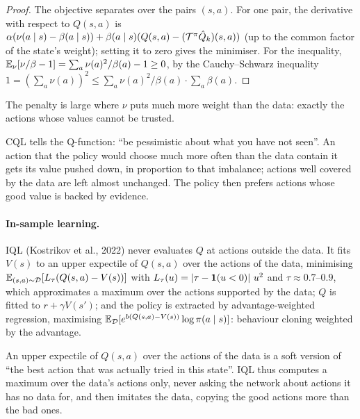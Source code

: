 \begin{proof}
  The objective separates over the pairs $(s, a)$. For one pair, the
  derivative with respect to $Q(s, a)$ is $\alpha (\nu(a \mid s) - \beta(a
  \mid s)) + \beta(a \mid s) (Q(s, a) - (\mathcal{T}^\pi \hat Q_k)(s, a))$ (up to
  the common factor of the state's weight); setting it to zero gives the
  minimiser. For the inequality, $\mathbb{E}_\nu[\nu / \beta - 1] = \sum_a \nu(a)^2
  / \beta(a) - 1 \geq 0$, by the Cauchy--Schwarz inequality $1 = (\sum_a
  \nu(a))^2 \leq \sum_a \nu(a)^2 / \beta(a) \cdot \sum_a \beta(a)$.
\end{proof}

The penalty is large where $\nu$ puts much more weight than the data:
exactly the actions whose values cannot be trusted.

\begin{intuition}
  CQL tells the Q-function: ``be pessimistic about what you have not
  seen''. An action that the policy would choose much more often than the
  data contain it gets its value pushed down, in proportion to that
  imbalance; actions well covered by the data are left almost unchanged.
  The policy then prefers actions whose good value is backed by evidence.
\end{intuition}

\paragraph{In-sample learning.} IQL (Kostrikov et al., 2022) never
evaluates $Q$ at actions outside the data. It fits $V(s)$ to an upper
expectile of $Q(s, a)$ over the actions of the data, minimising
$\mathbb{E}_{(s, a) \sim \mathcal{D}}[L_\tau(Q(s, a) - V(s))]$ with $L_\tau(u) =
\left\lvert \tau - \mathbf{1}(u < 0) \right\rvert\, u^2$ and $\tau \approx 0.7$--$0.9$, which
approximates a maximum over the actions supported by the data; $Q$ is
fitted to $r + \gamma V(s')$; and the policy is extracted by
advantage-weighted regression, maximising $\mathbb{E}_{\mathcal{D}}[e^{b (Q(s, a) -
V(s))} \log \pi(a \mid s)]$: behaviour cloning weighted by the advantage.

\begin{intuition}
  An upper expectile of $Q(s, a)$ over the actions of the data is a soft
  version of ``the best action that was actually tried in this state''. IQL
  thus computes a maximum over the data's actions only, never asking the
  network about actions it has no data for, and then imitates the data,
  copying the good actions more than the bad ones.
\end{intuition}


